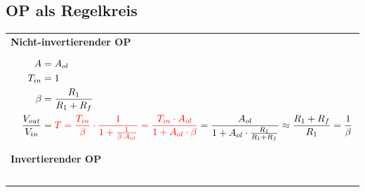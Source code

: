 \subsection{OP als Regelkreis}  
\vspace{-1.5\topsep}
\begin{longtable}[t]{|p{5cm}|p{12.7cm}|}
    \hline  
    \multicolumn{2}{|l|}{\bf Nicht-invertierender OP}
    \\ \hdashline
    \includegraphics[width=5cm, valign=t]{pictures/opAmpNI.png}\newline\newline
    \includegraphics[width=5cm]{pictures/OPnichtInv.png}
    & {\vspace{-1.5\topsep}
        \begin{align*}
            A &= A_{ol}\\
            T_{in} &= 1\\
            \beta &= \frac{R_1}{R_1 + R_f}\\
            \frac{V_{out}}{V_{in}} &= \textcolor{red}{T = \frac{T_{in}}{\beta}\cdot \frac{1}{1+ \frac{1}{\beta 
            \cdot A_{ol}}} = \frac{T_{in}\cdot A_{ol}}{1 + A_{ol}\cdot \beta}} = 
            \frac{A_{ol}}{1 + A_{ol} \cdot \frac{R_1}{R_1 + R_f}} \approx \frac{R_1 + R_f}{R_1} =\frac{1}{\beta}
        \end{align*}
    }
    \\ \hline
    \multicolumn{2}{|l|}{\bf Invertierender OP}
    \\ \hdashline
    \includegraphics[width=5cm, valign=t]{pictures/opAmpInv.png}\newline\newline

\end{longtable}
